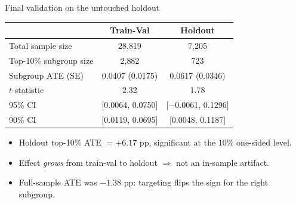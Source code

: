 \documentclass[aspectratio=169,11pt]{beamer}
\begin{document}
\begin{frame}{Final validation on the untouched holdout}
\begin{table}
\centering
\begin{tabular}{@{}lcc@{}}
\toprule
& \textbf{Train-Val} & \textbf{Holdout} \\
\midrule
Total sample size & 28{,}819 & 7{,}205 \\
Top-10\% subgroup size & 2{,}882 & 723 \\
Subgroup ATE (SE) & 0.0407 (0.0175) & \alert{0.0617 (0.0346)} \\
$t$-statistic & 2.32 & 1.78 \\
95\% CI & [0.0064, 0.0750] & [$-$0.0061, 0.1296] \\
90\% CI & [0.0119, 0.0695] & \alert{[0.0048, 0.1187]} \\
\bottomrule
\end{tabular}
\end{table}

\vspace{0.5em}
\begin{itemize}
  \item Holdout top-10\% ATE $= +6.17$ pp, \alert{significant at the 10\% one-sided level}.
  \item Effect \emph{grows} from train-val to holdout $\Rightarrow$ not an in-sample artifact.
  \item Full-sample ATE was $-1.38$ pp: targeting flips the sign for the right subgroup.
\end{itemize}
\end{frame}
\end{document}
